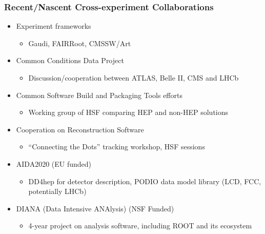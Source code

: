 \begin{frame}
\frametitle{Recent/Nascent Cross-experiment Collaborations}

\begin{itemize}
\item Experiment frameworks
  \begin{itemize}
  \item Gaudi, FAIRRoot, CMSSW/Art
  \end{itemize}
\item Common Conditions Data Project
  \begin{itemize}
  \item Discussion/cooperation between ATLAS, Belle II, CMS and LHCb
  \end{itemize}
\item Common Software Build and Packaging Tools efforts
  \begin{itemize}
  \item Working group of HSF comparing HEP and non-HEP solutions
  \end{itemize}
\item Cooperation on Reconstruction Software
  \begin{itemize}
  \item ``Connecting the Dots'' tracking workshop, HSF sessions 
  \end{itemize}
\item AIDA2020 (EU funded)
  \begin{itemize}
  \item DD4hep for detector description, PODIO data model library (LCD, FCC, potentially LHCb)
  \end{itemize}
\item DIANA (Data Intensive ANAlysis) (NSF Funded)
  \begin{itemize}
  \item 4-year project on analysis software, including ROOT and its ecosystem
  \end{itemize}
\end{itemize}

\end{frame}


